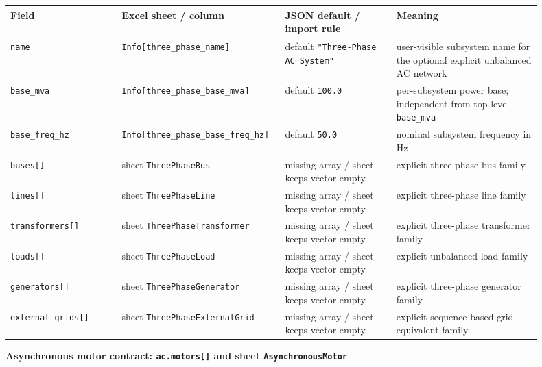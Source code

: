 \begin{longtable}{L{0.20\linewidth}L{0.24\linewidth}L{0.20\linewidth}L{0.26\linewidth}}
\toprule
Field & Excel sheet / column & JSON default / import rule & Meaning \\
\midrule
\endhead
\texttt{name} & \texttt{Info[three\_phase\_name]} & default \texttt{"Three-Phase AC System"} & user-visible subsystem name for the optional explicit unbalanced AC network \\
\texttt{base\_mva} & \texttt{Info[three\_phase\_base\_mva]} & default \texttt{100.0} & per-subsystem power base; independent from top-level \texttt{base\_mva} \\
\texttt{base\_freq\_hz} & \texttt{Info[three\_phase\_base\_freq\_hz]} & default \texttt{50.0} & nominal subsystem frequency in Hz \\
\texttt{buses[]} & sheet \texttt{ThreePhaseBus} & missing array / sheet keeps vector empty & explicit three-phase bus family \\
\texttt{lines[]} & sheet \texttt{ThreePhaseLine} & missing array / sheet keeps vector empty & explicit three-phase line family \\
\texttt{transformers[]} & sheet \texttt{ThreePhaseTransformer} & missing array / sheet keeps vector empty & explicit three-phase transformer family \\
\texttt{loads[]} & sheet \texttt{ThreePhaseLoad} & missing array / sheet keeps vector empty & explicit unbalanced load family \\
\texttt{generators[]} & sheet \texttt{ThreePhaseGenerator} & missing array / sheet keeps vector empty & explicit three-phase generator family \\
\texttt{external\_grids[]} & sheet \texttt{ThreePhaseExternalGrid} & missing array / sheet keeps vector empty & explicit sequence-based grid-equivalent family \\
\bottomrule
\end{longtable}

\noindent\textbf{Asynchronous motor contract: \texttt{ac.motors[]} and sheet \texttt{AsynchronousMotor}}

